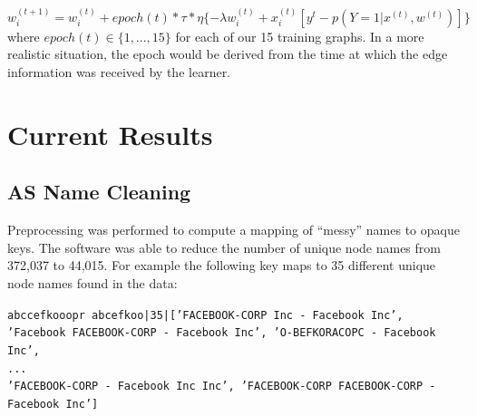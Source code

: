 \documentclass{article} %
\begin{document}
\begin{displaymath}
w_i^{(t+1)} = w_i^{(t)} + epoch(t)*\tau*\eta \{- \lambda w_i^{(t)} + x_i^{(t)} [ y^t -  p(Y=1|x^{(t)},w^{(t)})] \}
\end{displaymath}
where $epoch(t) \in \{ 1,...,15 \}$ for each of our 15 training graphs.  In a more realistic situation, the epoch would be derived from the time at
which the edge information was received by the learner.







\section{Current Results}

\subsection{AS Name Cleaning}

Preprocessing was performed to compute a mapping of ``messy'' names to opaque
keys.  The software was able to reduce the number of unique node names from
372,037 to 44,015. For example the following key maps to 35 different unique node names
found in the data:

{\small \texttt{abccefkooopr abcefkoo|35|['FACEBOOK-CORP Inc - Facebook
    Inc', 'Facebook FACEBOOK-CORP - Facebook Inc', 'O-BEFKORACOPC - Facebook
    Inc', \\
... \\'FACEBOOK-CORP - Facebook Inc Inc', 'FACEBOOK-CORP FACEBOOK-CORP - Facebook Inc']}}
\end{document}
